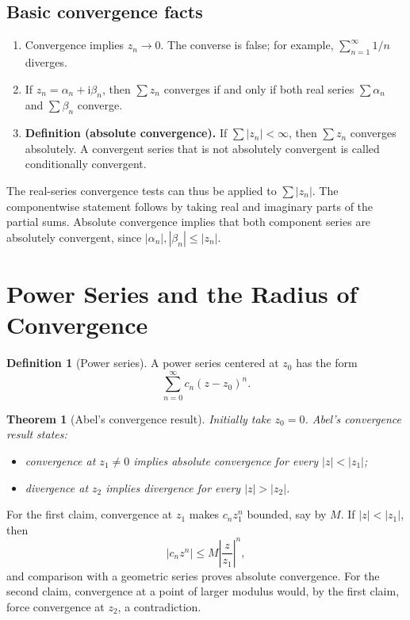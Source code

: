 \documentclass[11pt,a4paper]{article}
\theoremstyle{definition}
\newtheorem{definition}{Definition}
\theoremstyle{plain}
\newtheorem{theorem}{Theorem}
\begin{document}
\subsection{Basic convergence facts}
\begin{enumerate}
 \item Convergence implies $z_n\to0$. The converse is false; for example,
       $\sum_{n=1}^{\infty}1/n$ diverges.
 \item If $z_n=\alpha_n+\mathrm{i}\beta_n$, then $\sum z_n$ converges if and only if
       both real series $\sum\alpha_n$ and $\sum\beta_n$ converge.
 \item \textbf{Definition (absolute convergence).} If $\sum|z_n|<\infty$, then $\sum z_n$ converges absolutely.
       A convergent series that is not absolutely convergent is called
       conditionally convergent.
\end{enumerate}
The real-series convergence tests can thus be applied to $\sum |z_n|$.
The componentwise statement follows by taking real and imaginary parts
of the partial sums. Absolute convergence implies that both component
series are absolutely convergent, since $|\alpha_n|,|\beta_n|\leq|z_n|$.

\section{Power Series and the Radius of Convergence}
\begin{definition}[Power series]
A power series centered at $z_0$ has the form
\begin{equation}\label{eq:05}
\sum_{n=0}^{\infty}c_n(z-z_0)^n.
\end{equation}
\end{definition}

\begin{theorem}[Abel's convergence result]
Initially take $z_0=0$. Abel's convergence result states:
\begin{itemize}
 \item convergence at $z_1\neq0$ implies absolute convergence for
       every $|z|<|z_1|$;
 \item divergence at $z_2$ implies divergence for every $|z|>|z_2|$.
\end{itemize}
\end{theorem}

For the first claim, convergence at $z_1$ makes $c_n z_1^n$ bounded,
say by $M$. If $|z|<|z_1|$, then
\begin{equation}\label{eq:06}
|c_nz^n|\leq M\left|\frac z{z_1}\right|^n,
\end{equation}
and comparison with a geometric series proves absolute convergence.
For the second claim, convergence at a point of larger modulus would,
by the first claim, force convergence at $z_2$, a contradiction.
\end{document}
